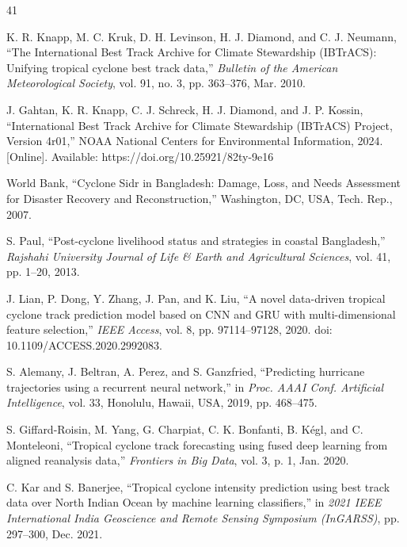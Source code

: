 \documentclass[conference]{IEEEtran}
\begin{document}

\renewcommand{\IEEEbibitemsep}{2pt plus 0.6pt}
\begin{thebibliography}{41}

K. R. Knapp, M. C. Kruk, D. H. Levinson, H. J. Diamond, and C. J. Neumann, ``The International Best Track Archive for Climate Stewardship (IBTrACS): Unifying tropical cyclone best track data,'' \textit{Bulletin of the American Meteorological Society}, vol. 91, no. 3, pp. 363--376, Mar. 2010.

J. Gahtan, K. R. Knapp, C. J. Schreck, H. J. Diamond, and J. P. Kossin, ``International Best Track Archive for Climate Stewardship (IBTrACS) Project, Version 4r01,'' NOAA National Centers for Environmental Information, 2024. [Online]. Available: https://doi.org/10.25921/82ty-9e16

World Bank, ``Cyclone Sidr in Bangladesh: Damage, Loss, and Needs Assessment for Disaster Recovery and Reconstruction,'' Washington, DC, USA, Tech. Rep., 2007.

S. Paul, ``Post-cyclone livelihood status and strategies in coastal Bangladesh,'' \textit{Rajshahi University Journal of Life \& Earth and Agricultural Sciences}, vol. 41, pp. 1--20, 2013.

J. Lian, P. Dong, Y. Zhang, J. Pan, and K. Liu, ``A novel data-driven tropical cyclone track prediction model based on CNN and GRU with multi-dimensional feature selection,'' \textit{IEEE Access}, vol. 8, pp. 97114--97128, 2020. doi: 10.1109/ACCESS.2020.2992083.

S. Alemany, J. Beltran, A. Perez, and S. Ganzfried, ``Predicting hurricane trajectories using a recurrent neural network,'' in \textit{Proc. AAAI Conf. Artificial Intelligence}, vol. 33, Honolulu, Hawaii, USA, 2019, pp. 468--475.

S. Giffard-Roisin, M. Yang, G. Charpiat, C. K. Bonfanti, B. K\'{e}gl, and C. Monteleoni, ``Tropical cyclone track forecasting using fused deep learning from aligned reanalysis data,'' \textit{Frontiers in Big Data}, vol. 3, p. 1, Jan. 2020.

C. Kar and S. Banerjee, ``Tropical cyclone intensity prediction using best track data over North Indian Ocean by machine learning classifiers,'' in \textit{2021 IEEE International India Geoscience and Remote Sensing Symposium (InGARSS)}, pp. 297--300, Dec. 2021.


\end{thebibliography}
\end{document}
